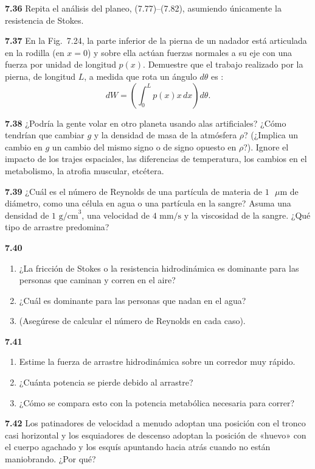 \documentclass[12pt]{book}
\begin{document}
\textbf{7.36} Repita el análisis del planeo, (7.77)--(7.82), asumiendo únicamente la resistencia de Stokes.

\textbf{7.37} En la Fig.~7.24, la parte inferior de la pierna de un nadador está articulada en la rodilla (en $x = 0$) y sobre ella actúan fuerzas normales a su eje con una fuerza por unidad de longitud $p(x)$. Demuestre que el trabajo realizado por la pierna, de longitud $L$, a medida que rota un ángulo $d\theta$ es \cite{11}:
\begin{equation}
dW = \left( \int_{0}^{L} p(x) x \, dx \right) d\theta.
\label{eq:784}
\end{equation}

\textbf{7.38} ¿Podría la gente volar en otro planeta usando alas artificiales? ¿Cómo tendrían que cambiar $g$ y la densidad de masa de la atmósfera $\rho$? (¿Implica un cambio en $g$ un cambio del mismo signo o de signo opuesto en $\rho$?). Ignore el impacto de los trajes espaciales, las diferencias de temperatura, los cambios en el metabolismo, la atrofia muscular, etcétera.

\textbf{7.39} ¿Cuál es el número de Reynolds de una partícula de materia de $1\text{ }\mu\text{m}$ de diámetro, como una célula en agua o una partícula en la sangre? Asuma una densidad de $1\text{ g/cm}^3$, una velocidad de $4\text{ mm/s}$ y la viscosidad de la sangre. ¿Qué tipo de arrastre predomina?

\textbf{7.40}
\begin{enumerate}
  \item[(a)] ¿La fricción de Stokes o la resistencia hidrodinámica es dominante para las personas que caminan y corren en el aire?
  \item[(b)] ¿Cuál es dominante para las personas que nadan en el agua?
  \item[] (Asegúrese de calcular el número de Reynolds en cada caso).
\end{enumerate}

\textbf{7.41}
\begin{enumerate}
  \item[(a)] Estime la fuerza de arrastre hidrodinámica sobre un corredor muy rápido.
  \item[(b)] ¿Cuánta potencia se pierde debido al arrastre?
  \item[(c)] ¿Cómo se compara esto con la potencia metabólica necesaria para correr?
\end{enumerate}

\textbf{7.42} Los patinadores de velocidad a menudo adoptan una posición con el tronco casi horizontal y los esquiadores de descenso adoptan la posición de «huevo» con el cuerpo agachado y los esquís apuntando hacia atrás cuando no están maniobrando. ¿Por qué?
\end{document}
